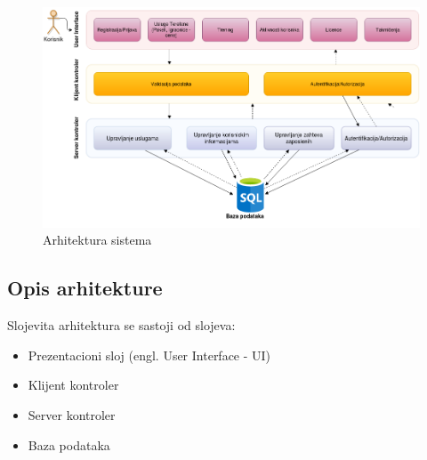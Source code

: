 \documentclass[../main.tex]{subfiles}
\begin{document}
\begin{figure}[!ht]
\begin{center}
\includegraphics[scale=0.55]{sections/images/arhitektura_sistema.png}
\end{center}
\caption{Arhitektura sistema}
\label{fig:kontekst}
\end{figure}

\subsection{Opis arhitekture}
Slojevita arhitektura se sastoji od slojeva: 
\begin{itemize}
    \item Prezentacioni sloj (engl. User Interface - UI)
    \item Klijent kontroler
    \item Server kontroler
    \item Baza podataka
\end{itemize}
\end{document}
